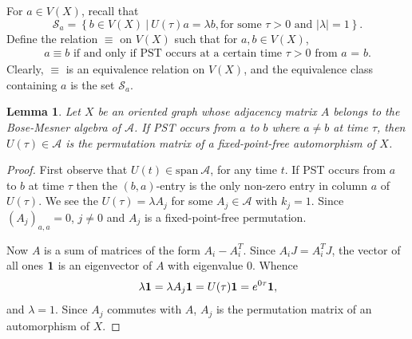 \documentclass{amsart}
\theoremstyle{plain}
\newtheorem{lemma}[theorem]{Lemma}
\theoremstyle{remark}\newtheorem{con}[theorem]{Construction}
\theoremstyle{remark} \newtheorem*{remark}{Remark}
\theoremstyle{remark} \newtheorem{example}{Example}
\newcommand{\cS}{\mathcal{S}}
\newcommand{\cA}{\mathcal{A}}
\newcommand{\BM}{\mathrm{span}\ \mathcal{A}}
\begin{document}
For $a\in V(X)$, recall that
\begin{equation*}
	\cS_a = \left\{ b \in V(X) \ \vert \ U(\tau)a = \lambda b, \text{for some $\tau > 0$ and $\vert\lambda\vert=1$}\right\}.
\end{equation*}
Define the relation $\equiv $ on $V(X)$ such that for $a,b\in V(X)$,
\begin{align*}
	a\equiv b \mbox{ if and only if PST occurs at a certain time $\tau>0$ from $a$ = $b$}. 
\end{align*}
Clearly, $\equiv$ is an equivalence relation on $V(X)$, and the equivalence class containing $a$ is the set $\mathcal{S}_a$.


\begin{lemma}\label{lem:BMalgP}
 Let $X$ be an oriented graph whose adjacency matrix $A$ belongs to the Bose-Mesner algebra of $\cA$.  
 If PST occurs from $a$ to $b$ where $a\neq b$ at time $\tau$, then $U(\tau) \in \cA$ is the permutation 
 matrix of a fixed-point-free automorphism of $X$.
\end{lemma}
\begin{proof}
    First observe that $U(t) \in \BM$, for any time $t$. If PST occurs from $a$ to $b$ at time $\tau$ then the $(b,a)$-entry is the only non-zero entry in column $a$ of $U(\tau)$.
    We see the $U(\tau) = \lambda A_j$ for some $A_j \in \cA$ with $k_j=1$.  Since $(A_j)_{a,a}=0$, $j\neq 0$ and $A_j$ is a fixed-point-free permutation.  

    Now $A$ is a sum of matrices of the form $A_i - A_i^T$.  Since $A_iJ=A_i^TJ$, the vector of all ones ${\bf 1}$ is an eigenvector of $A$ with eigenvalue $0$.
    Whence
    \begin{equation*}
      \lambda {\bf 1} =  \lambda A_j {\bf 1} = U(\tau) {\bf 1}= e^{0\tau} {\bf 1},
    \end{equation*}
    and $\lambda=1$. 
    Since $A_j$ commutes with $A$, $A_j$ is the permutation matrix of an automorphism of $X$.
\end{proof}
\end{document}

